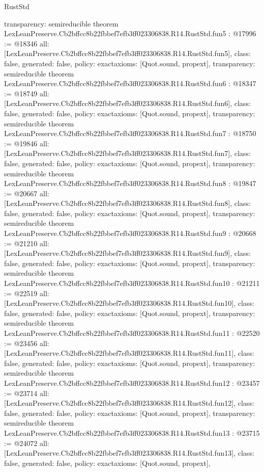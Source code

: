 \begin{lexlean}{RustStd}
\begin{coremodule}
{  transparency: semireducible
}
theorem LexLeanPreserve.Cb2bffcc8b22fbbef7efb3ff023306838.R14.RustStd.fun5 : @17996 := @18346 {
  all: [LexLeanPreserve.Cb2bffcc8b22fbbef7efb3ff023306838.R14.RustStd.fun5],
  class: false,
  generated: false,
  policy: exact{axioms: [Quot.sound, propext]},
  transparency: semireducible
}
theorem LexLeanPreserve.Cb2bffcc8b22fbbef7efb3ff023306838.R14.RustStd.fun6 : @18347 := @18749 {
  all: [LexLeanPreserve.Cb2bffcc8b22fbbef7efb3ff023306838.R14.RustStd.fun6],
  class: false,
  generated: false,
  policy: exact{axioms: [Quot.sound, propext]},
  transparency: semireducible
}
theorem LexLeanPreserve.Cb2bffcc8b22fbbef7efb3ff023306838.R14.RustStd.fun7 : @18750 := @19846 {
  all: [LexLeanPreserve.Cb2bffcc8b22fbbef7efb3ff023306838.R14.RustStd.fun7],
  class: false,
  generated: false,
  policy: exact{axioms: [Quot.sound, propext]},
  transparency: semireducible
}
theorem LexLeanPreserve.Cb2bffcc8b22fbbef7efb3ff023306838.R14.RustStd.fun8 : @19847 := @20667 {
  all: [LexLeanPreserve.Cb2bffcc8b22fbbef7efb3ff023306838.R14.RustStd.fun8],
  class: false,
  generated: false,
  policy: exact{axioms: [Quot.sound, propext]},
  transparency: semireducible
}
theorem LexLeanPreserve.Cb2bffcc8b22fbbef7efb3ff023306838.R14.RustStd.fun9 : @20668 := @21210 {
  all: [LexLeanPreserve.Cb2bffcc8b22fbbef7efb3ff023306838.R14.RustStd.fun9],
  class: false,
  generated: false,
  policy: exact{axioms: [Quot.sound, propext]},
  transparency: semireducible
}
theorem LexLeanPreserve.Cb2bffcc8b22fbbef7efb3ff023306838.R14.RustStd.fun10 : @21211 := @22519 {
  all: [LexLeanPreserve.Cb2bffcc8b22fbbef7efb3ff023306838.R14.RustStd.fun10],
  class: false,
  generated: false,
  policy: exact{axioms: [Quot.sound, propext]},
  transparency: semireducible
}
theorem LexLeanPreserve.Cb2bffcc8b22fbbef7efb3ff023306838.R14.RustStd.fun11 : @22520 := @23456 {
  all: [LexLeanPreserve.Cb2bffcc8b22fbbef7efb3ff023306838.R14.RustStd.fun11],
  class: false,
  generated: false,
  policy: exact{axioms: [Quot.sound, propext]},
  transparency: semireducible
}
theorem LexLeanPreserve.Cb2bffcc8b22fbbef7efb3ff023306838.R14.RustStd.fun12 : @23457 := @23714 {
  all: [LexLeanPreserve.Cb2bffcc8b22fbbef7efb3ff023306838.R14.RustStd.fun12],
  class: false,
  generated: false,
  policy: exact{axioms: [Quot.sound, propext]},
  transparency: semireducible
}
theorem LexLeanPreserve.Cb2bffcc8b22fbbef7efb3ff023306838.R14.RustStd.fun13 : @23715 := @24072 {
  all: [LexLeanPreserve.Cb2bffcc8b22fbbef7efb3ff023306838.R14.RustStd.fun13],
  class: false,
  generated: false,
  policy: exact{axioms: [Quot.sound, propext]},
}
\end{coremodule}
\end{lexlean}
